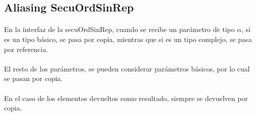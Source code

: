 \subsection*{Aliasing SecuOrdSinRep}

\paragraph{}
En la interfaz de la secuOrdSinRep, cuando se recibe un par\'ametro de tipo $\alpha$, si es un tipo b\'asico, se pasa por copia, mientras que si es un tipo complejo, se pasa por referencia.

\paragraph{}
El resto de los par\'ametros, se pueden considerar par\'ametros b\'asicos, por lo cual se pasan por copia.

\paragraph{}
En el caso de los elementos devueltos como resultado, siempre se devuelven por copia.